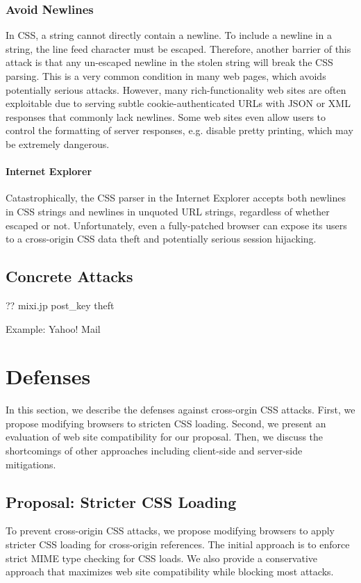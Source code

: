\documentclass{acm_proc_article-sp}
\begin{document}
{\subsubsection{Avoid Newlines}
In CSS, a string cannot directly contain a newline. To include a newline in a string, the line feed character must be escaped. Therefore, another barrier of this attack is that any un-escaped newline in the stolen string will break the CSS parsing. This is a very common condition in many web pages, which avoids potentially serious attacks. However, many rich-functionality web sites are often exploitable due to serving subtle cookie-authenticated URLs with JSON or XML responses that commonly lack newlines. Some web sites even allow users to control the formatting of server responses, e.g. disable pretty printing, which may be extremely dangerous.
\paragraph{Internet Explorer}
Catastrophically, the CSS parser in the Internet Explorer accepts both newlines in CSS strings and newlines in unquoted URL strings, regardless of whether escaped or not. Unfortunately, even a fully-patched browser can expose its users to a cross-origin CSS data theft and potentially serious session hijacking.

\subsection{Concrete Attacks}
?? mixi.jp post\_key theft\cite{cssxss}

Example: Yahoo! Mail

\section{Defenses}
In this section, we describe the defenses against cross-orgin CSS attacks. First, we propose modifying browsers to stricten CSS loading. Second, we present an evaluation of web site compatibility for our proposal. Then, we discuss the shortcomings of other approaches including client-side and server-side mitigations.

\subsection{Proposal: Stricter CSS Loading}
To prevent cross-origin CSS attacks, we propose modifying browsers to apply stricter CSS loading for cross-origin references. The initial approach is to enforce strict MIME type checking for CSS loads. We also provide a conservative approach that maximizes web site compatibility while blocking most attacks.

}
\end{document}
